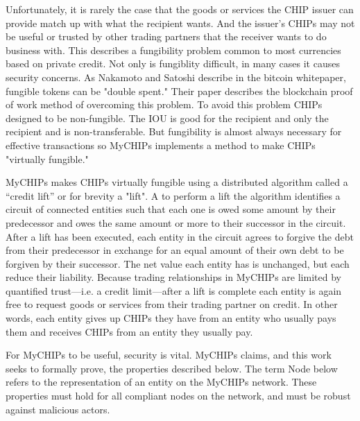 \documentclass[article, onecolumn, 12pt]{IEEEtran}
\begin{document}
Unfortunately, it is rarely the case that the goods or services the CHIP issuer can provide match up with what the recipient wants. And the issuer's CHIPs may not be useful or trusted by other trading partners that the receiver wants to do business with. This describes a fungibility problem common to most currencies based on private credit. Not only is fungiblity difficult, in many cases it causes security concerns. As Nakamoto and Satoshi describe in the bitcoin whitepaper, fungible tokens can be "double spent." Their paper describes the blockchain proof of work method of overcoming this problem. \cite{bitcoin} To avoid this problem CHIPs designed to be non-fungible. The IOU is good for the recipient and only the recipient and is non-transferable. But fungibility is almost always necessary for effective transactions so MyCHIPs implements a method to make CHIPs "virtually fungible."

 MyCHIPs makes CHIPs virtually fungible using a distributed algorithm called a “credit lift” or for brevity a "lift". A to perform a lift the algorithm identifies a circuit of connected entities such that each one is owed some amount by their predecessor and owes the same amount or more to their successor in the circuit. After a lift has been executed, each entity in the circuit agrees to forgive the debt from their predecessor in exchange for an equal amount of their own debt to be forgiven by their successor. The net value each entity has is unchanged, but each reduce their liability.  Because trading relationships in MyCHIPs are limited by quantified trust---i.e. a credit limit---after a lift is complete each entity is again free to request goods or services from their trading partner on credit. In other words, each entity gives up CHIPs they have from an entity who usually pays them and receives CHIPs from an entity they usually pay.

For MyCHIPs to be useful, security is vital. MyCHIPs claims, and this work seeks to formally prove, the properties described below. The term Node below refers to the representation of an entity on the MyCHIPs network. These properties must hold for all compliant nodes on the network, and must be robust against malicious actors.
\end{document}
